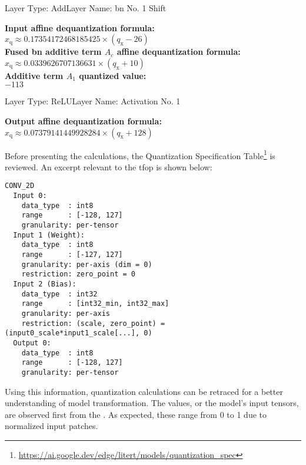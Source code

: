 {\begin{layerbox}{Layer Type: Add}{Layer Name: \gls{bn} No. 1 Shift}
  \begin{center}
    \textbf{Input affine dequantization formula:} \\[2pt]
    $x_{\text{q}} \approx 0.17354172468185425 \times (q_{\text{x}} - 26)$ \\[6pt]
    \textbf{Fused \gls{bn} additive term $A_c$ affine dequantization formula:} \\[2pt]
    $x_{\text{q}} \approx 0.0339626707136631 \times (q_{\text{x}} + 10)$ \\[6pt]
    \textbf{Additive term $A_1$ quantized value:} \\[2pt]
    $-113$ \\[6pt]
  \end{center}
\end{layerbox}

\begin{layerbox}{Layer Type: ReLU}{Layer Name: Activation No. 1}
  \begin{center}
    \textbf{Output affine dequantization formula:} \\[2pt]
    $x_{\text{q}} \approx 0.07379141449928284 \times (q_{\text{x}} + 128)$ \\[6pt]
  \end{center}
\end{layerbox}

\clearpage
Before presenting the calculations, the Quantization Specification Table\footnote{\url{https://ai.google.dev/edge/litert/models/quantization_spec}} is reviewed.
An excerpt relevant to the \gls{tfop}  is shown below:

\begin{verbatim}
CONV_2D
  Input 0:
    data_type  : int8
    range      : [-128, 127]
    granularity: per-tensor
  Input 1 (Weight):
    data_type  : int8
    range      : [-127, 127]
    granularity: per-axis (dim = 0)
    restriction: zero_point = 0
  Input 2 (Bias):
    data_type  : int32
    range      : [int32_min, int32_max]
    granularity: per-axis
    restriction: (scale, zero_point) = (input0_scale*input1_scale[...], 0)
  Output 0:
    data_type  : int8
    range      : [-128, 127]
    granularity: per-tensor
\end{verbatim}

Using this information, quantization calculations can be retraced for a better understanding of model transformation.
The  values, or the model's input tensors, are observed first from the .
As expected, these range from 0 to 1 due to normalized input patches.

}
